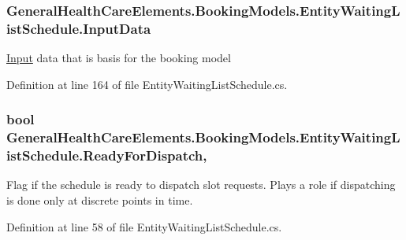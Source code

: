 \subsubsection[{\texorpdfstring{Input\+Data}{InputData}}]{ General\+Health\+Care\+Elements.\+Booking\+Models.\+Entity\+Waiting\+List\+Schedule.\+Input\+Data\hspace{0.3cm}{\ttfamily [get]}}\hypertarget{class_general_health_care_elements_1_1_booking_models_1_1_entity_waiting_list_schedule_ac4022d99c7ca6dec1e77b2fba2f68e3f}{}\label{class_general_health_care_elements_1_1_booking_models_1_1_entity_waiting_list_schedule_ac4022d99c7ca6dec1e77b2fba2f68e3f}


\hyperlink{namespace_general_health_care_elements_1_1_input}{Input} data that is basis for the booking model 



Definition at line 164 of file Entity\+Waiting\+List\+Schedule.\+cs.

\subsubsection[{\texorpdfstring{Ready\+For\+Dispatch}{ReadyForDispatch}}]{\setlength{\rightskip}{0pt plus 5cm}bool General\+Health\+Care\+Elements.\+Booking\+Models.\+Entity\+Waiting\+List\+Schedule.\+Ready\+For\+Dispatch\hspace{0.3cm}{\ttfamily [get]}, {\ttfamily [set]}}\hypertarget{class_general_health_care_elements_1_1_booking_models_1_1_entity_waiting_list_schedule_a2ffd912b953b0ce1db8e950e50ecee36}{}\label{class_general_health_care_elements_1_1_booking_models_1_1_entity_waiting_list_schedule_a2ffd912b953b0ce1db8e950e50ecee36}


Flag if the schedule is ready to dispatch slot requests. Plays a role if dispatching is done only at discrete points in time. 



Definition at line 58 of file Entity\+Waiting\+List\+Schedule.\+cs.

